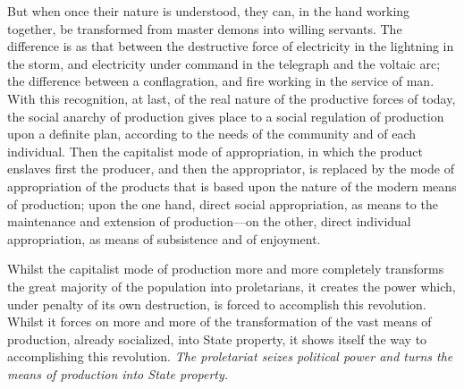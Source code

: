 But when once their nature is understood, they can, in the hand working
together, be transformed from master demons into willing servants. The
difference is as that between the destructive force of electricity in the
lightning in the storm, and electricity under command in the telegraph and the
voltaic arc; the difference between a conflagration, and fire working in the
service of man. With this recognition, at last, of the real nature of the
productive forces of today, the social anarchy of production gives place to a
social regulation of production upon a definite plan, according to the needs of
the community and of each individual. Then the capitalist mode of appropriation,
in which the product enslaves first the producer, and then the appropriator, is
replaced by the mode of appropriation of the products that is based upon the
nature of the modern means of production; upon the one hand, direct social
appropriation, as means to the maintenance and extension of production---on the
other, direct individual appropriation, as means of subsistence and of
enjoyment. 

Whilst the capitalist mode of production more and more completely transforms the
great majority of the population into proletarians, it creates the power which,
under penalty of its own destruction, is forced to accomplish this revolution.
Whilst it forces on more and more of the transformation of the vast means of
production, already socialized, into State property, it shows itself the way to
accomplishing this revolution. \emph{The proletariat seizes political power and
turns the means of production into State property.}

